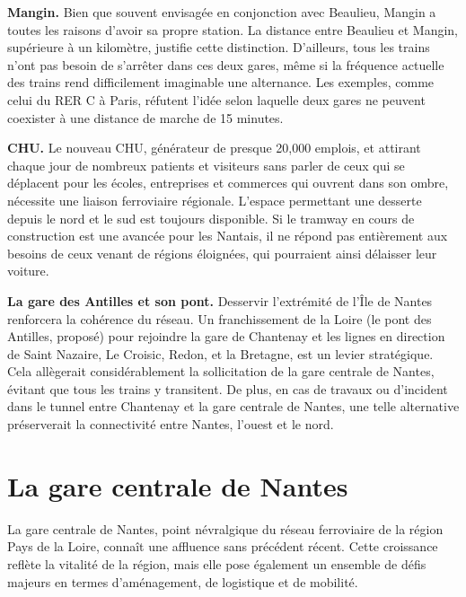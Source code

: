\textbf{Mangin.}
Bien que souvent envisagée en conjonction avec Beaulieu, Mangin a
toutes les raisons d'avoir sa propre station. La distance entre
Beaulieu et Mangin, supérieure à un kilomètre, justifie cette
distinction. D’ailleurs, tous les trains n'ont pas besoin de s'arrêter
dans ces deux gares, même si la fréquence actuelle des trains rend
difficilement imaginable une alternance. Les exemples, comme celui du
RER C à Paris, réfutent l'idée selon laquelle deux gares ne peuvent
coexister à une distance de marche de 15 minutes.

\textbf{CHU.}  Le nouveau CHU, générateur de presque 20,000 emplois,
et attirant chaque jour de nombreux patients et visiteurs sans parler
de ceux qui se déplacent pour les écoles, entreprises et commerces qui
ouvrent dans son ombre, nécessite une liaison ferroviaire
régionale. L'espace permettant une desserte depuis le nord et le sud
est toujours disponible. Si le tramway en cours de construction est
une avancée pour les Nantais, il ne répond pas entièrement aux besoins
de ceux venant de régions éloignées, qui pourraient ainsi délaisser
leur voiture.

\textbf{La gare des Antilles et son pont.}  Desservir l’extrémité de
l'Île de Nantes renforcera la cohérence du réseau. Un franchissement
de la Loire (le pont des Antilles, proposé) pour rejoindre la gare de
Chantenay et les lignes en direction de Saint Nazaire, Le Croisic,
Redon, et la Bretagne, est un levier stratégique. Cela allègerait
considérablement la sollicitation de la gare centrale de Nantes,
évitant que tous les trains y transitent.  De plus, en cas de travaux
ou d'incident dans le tunnel entre Chantenay et la gare centrale de
Nantes, une telle alternative préserverait la connectivité entre
Nantes, l'ouest et le nord.




\section{La gare centrale de Nantes}

La gare centrale de Nantes, point névralgique du réseau ferroviaire de
la région Pays de la Loire, connaît une affluence sans précédent
récent. Cette croissance reflète la vitalité de la région, mais elle
pose également un ensemble de défis majeurs en termes d'aménagement,
de logistique et de mobilité.

